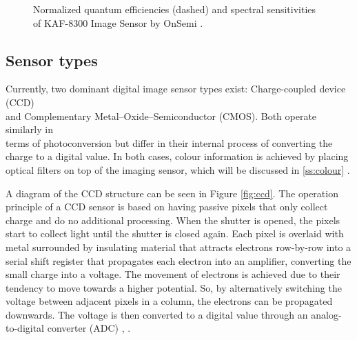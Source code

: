 \begin{figure}
    \centering
    \caption{Normalized quantum efficiencies (dashed) and spectral sensitivities of KAF-8300 Image Sensor by OnSemi \cite{onsemi}.}
    \label{fig:qe}
\end{figure}

\subsection{Sensor types}

Currently, two dominant digital image sensor types exist:  Charge-coupled device (CCD) \\ and Complementary Metal–Oxide–Semiconductor (CMOS). Both operate similarly in \\ terms of photoconversion but differ in their internal process of converting the charge to a digital value. In both cases, colour information is achieved by placing optical filters on top of the imaging sensor, which will be discussed in \ref{ss:colour}  \cite[17]{nakamura}.

A diagram of the CCD structure can be seen in Figure \ref{fig:ccd}. The operation principle of a CCD sensor is based on having passive pixels that only collect charge and do no additional processing. When the shutter is opened, the pixels start to collect light until the shutter is closed again. Each pixel is overlaid with metal surrounded by insulating material that attracts electrons row-by-row into a serial shift register that propagates each electron into an amplifier, converting the small charge into a voltage. The movement of electrons is achieved due to their tendency to move towards a higher potential. So, by alternatively switching the voltage between adjacent pixels in a column, the electrons can be propagated downwards. The voltage is then converted to a digital value through an analog-to-digital converter (ADC)  \cite[95-139]{nakamura}, \cite[4]{Park2016}.


